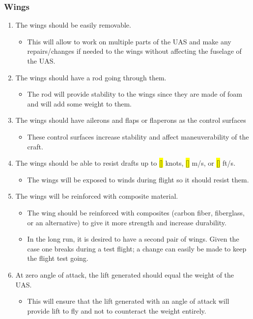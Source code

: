 \documentclass{article}
\begin{document}
\subsubsection{Wings}
\begin{enumerate}
  \item{The wings should be easily removable.}
  \begin{itemize}
    \item{This will allow to work on multiple parts of the UAS and make any repairs/changes if needed to the wings without affecting the fuselage of the UAS.}
  \end{itemize}
  
  \item{The wings should have a rod going through them.}
  \begin{itemize}
    \item{The rod will provide stability to the wings since they are made of foam and will add some weight to them.}
  \end{itemize}
  
  \item{The wings should have ailerons and flaps or flaperons as the control surfaces}
  \begin{itemize}
     \item{These control surfaces increase stability and affect maneuverability of the craft.}
  \end{itemize}
  
  \item{The wings should be able to resist drafts up to \hl{[]} knots, \hl{[]} m/s, or \hl{[]} ft/s.}
  \begin{itemize}
    \item{The wings will be exposed to winds during flight so it should resist them.}
  \end{itemize}
  
  \item{The wings will be reinforced with composite material.}
  \begin{itemize}
    \item{The wing should be reinforced with composites (carbon fiber, fiberglass, or an alternative) to give it more strength and increase durability.}
    \item{In the long run, it is desired to have a second pair of wings. Given the case one breaks during a test flight; a change can easily be made to keep the flight test going.}
  \end{itemize}
  
  \item{At zero angle of attack, the lift generated should equal the weight of the UAS.}
  \begin{itemize}
    \item{This will ensure that the lift generated with an angle of attack will provide lift to fly and not to counteract the weight entirely.}
  \end{itemize}
\end{enumerate}
\end{document}
